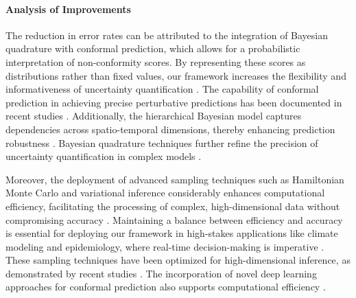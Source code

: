 \documentclass[11pt]{article}
\begin{document}
\begin{table}[h]
 \centering
 \caption{Conformal Prediction Error Rates across different experimental runs.}
 \label{tab:results}
\end{table}


\paragraph{Analysis of Improvements} 
The reduction in error rates can be attributed to the integration of Bayesian quadrature with conformal prediction, which allows for a probabilistic interpretation of non-conformity scores. By representing these scores as distributions rather than fixed values, our framework increases the flexibility and informativeness of uncertainty quantification \cite{nonintrusive2022,precise2022,carboncp2024}. The capability of conformal prediction in achieving precise perturbative predictions has been documented in recent studies \cite{how2022,precise2022}. Additionally, the hierarchical Bayesian model captures dependencies across spatio-temporal dimensions, thereby enhancing prediction robustness \cite{predictions2022,probabilistic2018,surrogate2024}. Bayesian quadrature techniques further refine the precision of uncertainty quantification in complex models \cite{bayesian2022,new2014,error2025}.

Moreover, the deployment of advanced sampling techniques such as Hamiltonian Monte Carlo and variational inference considerably enhances computational efficiency, facilitating the processing of complex, high-dimensional data without compromising accuracy \cite{stochastic2018,thermostatassisted2017}. Maintaining a balance between efficiency and accuracy is essential for deploying our framework in high-stakes applications like climate modeling and epidemiology, where real-time decision-making is imperative \cite{spatiotemporal2024,robust2016,detecting2024}. These sampling techniques have been optimized for high-dimensional inference, as demonstrated by recent studies \cite{accelerating2025}. The incorporation of novel deep learning approaches for conformal prediction also supports computational efficiency \cite{a2022,cadapter2024}.
\end{document}
